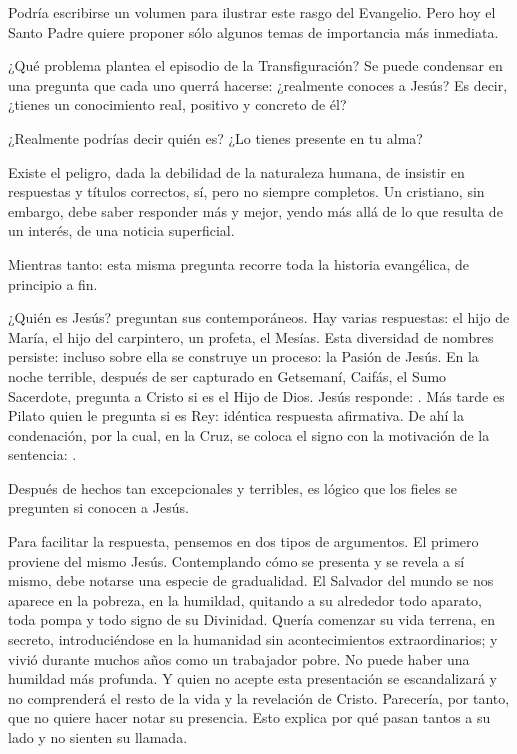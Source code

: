 \begin{body}
Podría escribirse un volumen para ilustrar este rasgo del Evangelio. Pero hoy el Santo Padre quiere proponer sólo algunos temas de importancia más inmediata.

¿Qué problema plantea el episodio de la Transfiguración? Se puede condensar en una pregunta que cada uno querrá hacerse: ¿realmente conoces a Jesús? Es decir, ¿tienes un conocimiento real, positivo y concreto de él?

¿Realmente podrías decir quién es? ¿Lo tienes presente en tu alma?

Existe el peligro, dada la debilidad de la naturaleza humana, de insistir en respuestas y títulos correctos, sí, pero no siempre completos. Un cristiano, sin embargo, debe saber responder más y mejor, yendo más allá de lo que resulta de un interés, de una noticia superficial.

Mientras tanto: esta misma pregunta recorre toda la historia evangélica, de principio a fin.


¿Quién es Jesús? preguntan sus contemporáneos. Hay varias respuestas: el hijo de María, el hijo del carpintero, un profeta, el Mesías. Esta diversidad de nombres persiste: incluso sobre ella se construye un proceso: la Pasión de Jesús. En la noche terrible, después de ser capturado en Getsemaní, Caifás, el Sumo Sacerdote, pregunta a Cristo si es el Hijo de Dios. Jesús responde: . Más tarde es Pilato quien le pregunta si es Rey: idéntica respuesta afirmativa. De ahí la condenación, por la cual, en la Cruz, se coloca el signo con la motivación de la sentencia: .

Después de hechos tan excepcionales y terribles, es lógico que los fieles se pregunten si conocen a Jesús.

Para facilitar la respuesta, pensemos en dos tipos de argumentos. El primero proviene del mismo Jesús. Contemplando cómo se presenta y se revela a sí mismo, debe notarse una especie de gradualidad. El Salvador del mundo se nos aparece en la pobreza, en la humildad, quitando a su alrededor todo aparato, toda pompa y todo signo de su Divinidad. Quería comenzar su vida terrena, en secreto, introduciéndose en la humanidad sin acontecimientos extraordinarios; y vivió durante muchos años como un trabajador pobre. No puede haber una humildad más profunda. Y quien no acepte esta presentación se escandalizará y no comprenderá el resto de la vida y la revelación de Cristo. Parecería, por tanto, que no quiere hacer notar su presencia. Esto explica por qué pasan tantos a su lado y no sienten su llamada.


\end{body}
